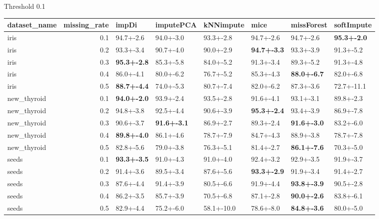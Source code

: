 

 Threshold 0.1 
 \begin{tabular}{lrllllll}
\toprule
dataset_name &  missing_rate &              impDi &          imputePCA &  kNNimpute &               mice &         missForest &         softImpute \\
\midrule
        iris &           0.1 &          94.7+-2.6 &          94.0+-3.0 &  93.3+-2.8 &          94.7+-2.6 &          94.7+-2.6 & \textbf{95.3+-2.0} \\
        iris &           0.2 &          93.3+-3.4 &          90.7+-4.0 &  90.0+-2.9 & \textbf{94.7+-3.3} &          93.3+-3.9 &          91.3+-5.2 \\
        iris &           0.3 & \textbf{95.3+-2.8} &          85.3+-5.8 &  84.0+-5.2 &          91.3+-3.4 &          89.3+-5.2 &          91.3+-4.8 \\
        iris &           0.4 &          86.0+-4.1 &          80.0+-6.2 &  76.7+-5.2 &          85.3+-4.3 & \textbf{88.0+-6.7} &          82.0+-6.8 \\
        iris &           0.5 & \textbf{88.7+-4.4} &          74.0+-5.3 &  80.7+-7.4 &          82.0+-6.2 &          87.3+-3.6 &         72.7+-11.1 \\
 new_thyroid &           0.1 & \textbf{94.0+-2.0} &          93.9+-2.4 &  93.5+-2.8 &          91.6+-4.1 &          93.1+-3.1 &          89.8+-2.3 \\
 new_thyroid &           0.2 &          94.8+-3.8 &          92.5+-4.4 &  90.6+-3.9 & \textbf{95.3+-2.4} &          93.4+-3.9 &          86.9+-7.8 \\
 new_thyroid &           0.3 &          90.6+-3.7 & \textbf{91.6+-3.1} &  86.9+-2.7 &          89.3+-2.4 & \textbf{91.6+-3.0} &          83.2+-6.0 \\
 new_thyroid &           0.4 & \textbf{89.8+-4.0} &          86.1+-4.6 &  78.7+-7.9 &          84.7+-4.3 &          88.9+-3.8 &          78.7+-7.8 \\
 new_thyroid &           0.5 &          82.8+-5.6 &          79.0+-3.8 &  76.3+-5.1 &          81.4+-2.7 & \textbf{86.1+-7.6} &          70.3+-5.0 \\
       seeds &           0.1 & \textbf{93.3+-3.5} &          91.0+-4.3 &  91.0+-4.0 &          92.4+-3.2 &          92.9+-3.5 &          91.9+-3.7 \\
       seeds &           0.2 &          91.4+-3.6 &          89.5+-3.4 &  87.6+-5.6 & \textbf{93.3+-2.9} &          91.9+-3.4 &          91.4+-2.7 \\
       seeds &           0.3 &          87.6+-4.4 &          91.4+-3.9 &  80.5+-6.6 &          91.9+-4.4 & \textbf{93.8+-3.9} &          90.5+-2.8 \\
       seeds &           0.4 &          86.2+-3.5 &          85.7+-3.9 &  70.5+-6.8 &          87.1+-2.8 & \textbf{90.0+-2.6} &          83.8+-6.1 \\
       seeds &           0.5 &          82.9+-4.4 &          75.2+-6.0 & 58.1+-10.0 &          78.6+-8.0 & \textbf{84.8+-3.6} &          80.0+-5.0 \\
\bottomrule
\end{tabular}
